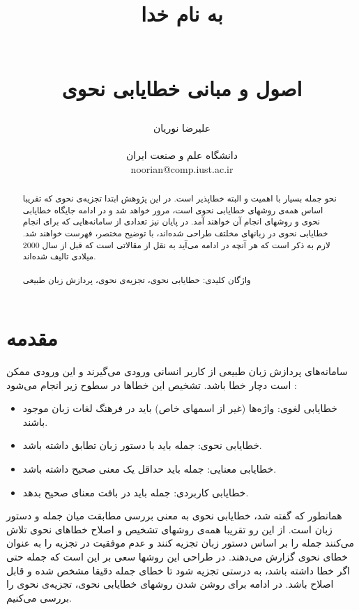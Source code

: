 \documentclass{report}
\title{
\begin{normalsize}
به نام خدا
\end{normalsize}
\\[4cm]
اصول و مبانی خطایابی نحوی
}
\author{علیرضا نوریان
\\
\\ \small دانشگاه علم و صنعت ایران
\\ \small noorian@comp.iust.ac.ir
}
\begin{document}
\maketitle

\tableofcontents

\begin{abstract}
نحو جمله بسیار با اهمیت و البته خطاپذیر است. در این پژوهش ابتدا تجزیه‌ی نحوی که تقریبا اساس همه‌ی روشهای خطایابی نحوی است، مرور خواهد شد و در ادامه جایگاه خطایابی نحوی و روشهای انجام آن خواهند آمد. در پایان نیز  تعدادی از سامانه‌هایی که برای انجام خطایابی نحوی در زبانهای مخلتف طراحی شده‌اند، با توضیح مختصر، فهرست خواهند شد. لازم به ذکر است که هر آنچه در ادامه می‌آید به نقل از مقالاتی است که قبل از سال 2000 میلادی تالیف شده‌اند.
\\
\\
واژگان کلیدی: خطایابی نحوی، تجزیه‌ی نحوی، پردازش زبان طبیعی

\end{abstract}

\section{مقدمه}
سامانه‌های پردازش زبان طبیعی از کاربر انسانی ورودی می‌گیرند و این ورودی ممکن است دچار خطا باشد. تشخیص این خطاها در سطوح زیر انجام می‌شود \cite{ct2}:
\begin{itemize}
\item
خطایابی لغوی: واژه‌ها (غیر از اسمهای خاص) باید در فرهنگ لغات زبان موجود باشند.
\item
خطایابی نحوی: جمله باید با دستور زبان تطابق داشته باشد.
\item
خطایابی معنایی: جمله باید حداقل یک معنی صحیح داشته باشد.
\item
خطایابی کاربردی: جمله باید در بافت معنای صحیح بدهد.
\end{itemize}
همانطور که گفته شد، خطایابی نحوی به معنی بررسی مطابقت میان جمله و دستور زبان است. از این رو تقریبا همه‌ی روشهای تشخیص و اصلاح خطاهای نحوی تلاش می‌کنند جمله را بر اساس دستور زبان تجزیه کنند و عدم موفقیت در تجزیه را به عنوان خطای نحوی گزارش می‌دهند. در طراحی این روشها سعی بر این است که جمله حتی اگر خطا داشته باشد، به درستی تجزیه شود تا خطای جمله دقیقا مشخص شده و قابل اصلاح باشد. در ادامه برای روشن شدن روشهای خطایابی نحوی، تجزیه‌ی نحوی را بررسی می‌کنیم.
\end{document}
